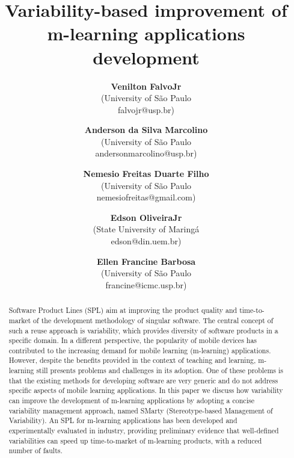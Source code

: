 \documentclass[10pt,a4paper]{article}
\begin{document}
\title{Variability-based improvement of m-learning applications development}

\author{{\bfseries Venilton FalvoJr}\\
   (University of São Paulo \\
   falvojr@usp.br)
   \and
   {\bfseries Anderson da Silva Marcolino}\\
   (University of São Paulo \\
   andersonmarcolino@usp.br)
   \and
   {\bfseries Nemesio Freitas Duarte Filho}\\
   (University of São Paulo \\
   nemesiofreitas@gmail.com)
   \and
   {\bfseries Edson OliveiraJr}\\
   (State University of Maringá \\
   edson@din.uem.br)
   \and
   {\bfseries Ellen Francine Barbosa}\\
   (University of São Paulo \\
   francine@icmc.usp.br)\\
}
\maketitle

\begin{abstract}
Software Product Lines (SPL) aim at improving the product quality and time-to-market of the development methodology of singular software. The central concept of such a reuse approach is variability, which provides diversity of software products in a specific domain. In a different perspective, the popularity of mobile devices has contributed to the increasing demand for mobile learning (m-learning) applications. However, despite the benefits provided in the context of teaching and learning, m-learning still presents problems and challenges in its adoption. One of these problems is that the existing methods for developing software are very generic and do not address specific aspects of mobile learning applications. In this paper we discuss how variability can improve the development of m-learning applications by adopting a concise variability management approach, named SMarty (Stereotype-based Management of Variability). An SPL for m-learning applications has been developed and experimentally evaluated in industry, providing preliminary evidence that well-defined variabilities can speed up time-to-market of m-learning products, with a reduced number of faults.
\end{abstract}
\end{document}
